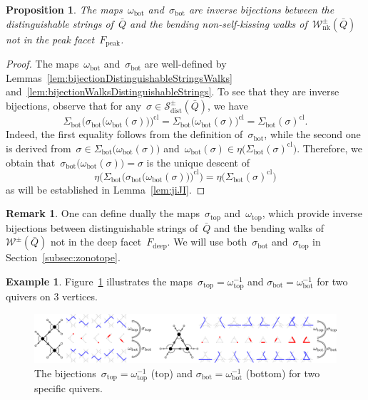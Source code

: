 \documentclass{amsart}
\newtheorem{proposition}[theorem]{Proposition}
\theoremstyle{definition}
\newtheorem{example}[theorem]{Example}
\newtheorem{remark}[theorem]{Remark}
\newcommand{\fref}[1]{Figure~\ref{#1}} %
\newcommand{\distinguishableStrings}{\mathcal{S}_\mathrm{dist}} %
\newcommand{\walks}{\mathcal{W}} %
\newcommand{\NKWalks}{\mathcal{W}_\mathrm{nk}} %
\newcommand{\peak}{\mathrm{peak}} %
\newcommand{\deep}{\mathrm{deep}} %
\renewcommand{\top}{\mathrm{top}} %
\newcommand{\bottom}{\mathrm{bot}} %
\newcommand{\closure}[1]{#1^{\mathrm{cl}}} %
\begin{document}
\begin{proposition}
\label{prop:bijectionDistinguishableStringsWalks}
The maps~$\omega_\bottom$ and~$\sigma_\bottom$ are inverse bijections between the distinguishable strings of~$\bar Q$ and the bending non-self-kissing walks of~$\NKWalks^\pm(\bar Q)$ not in the peak facet~$F_\peak$.
\end{proposition}

\begin{proof}
The maps~$\omega_\bottom$ and~$\sigma_\bottom$ are well-defined by Lemmas~\ref{lem:bijectionDistinguishableStringsWalks} and~\ref{lem:bijectionWalksDistinguishableStrings}.
To see that they are inverse bijections, observe that for any~$\sigma \in \distinguishableStrings^\pm(\bar Q)$, we have\[
\closure{ \Sigma_\bottom \big( \sigma_\bottom \big( \omega_\bottom(\sigma) \big) \big)}
= \closure{\Sigma_\bottom \big( \omega_\bottom(\sigma) \big)}
= \closure{\Sigma_\bottom(\sigma)}.
\]
Indeed, the first equality follows from the definition of~$\sigma_\bottom$, while the second one is derived from~$\sigma \in \Sigma_\bottom \big( \omega_\bottom(\sigma) \big)$ and~$\omega_\bottom(\sigma) \in \eta \big( \closure{\Sigma_\bottom(\sigma)} \big)$.
Therefore, we obtain that~$\sigma_\bottom \big( \omega_\bottom(\sigma) \big) = \sigma$ is the unique descent of
\[
\eta \big( \closure{ \Sigma_\bottom \big( \sigma_\bottom \big( \omega_\bottom(\sigma) \big) \big)} \big) = \eta \big( \closure{\Sigma_\bottom(\sigma)} \big)
\]
as will be established in Lemma~\ref{lem:jiJI}.
\end{proof}

\begin{remark}
\label{rem:bijectionDistinguishableStringsWalks}
One can define dually the maps~$\sigma_\top$ and~$\omega_\top$, which provide inverse bijections between distinguishable strings of~$\bar Q$ and the bending walks of~$\walks^\pm(\bar Q)$ not in the deep facet~$F_\deep$.
We will use both~$\sigma_\bottom$ and~$\sigma_\top$ in Section~\ref{subsec:zonotope}.
\end{remark}

\begin{example}
\fref{fig:exmBijectionStringsWalks2} illustrates the maps~$\sigma_\top = \omega_\top^{-1}$ and $\sigma_\bottom = \omega_\bottom^{-1}$ for two quivers on $3$ vertices.

\begin{figure}[t]
	\capstart
	\centerline{\includegraphics[scale=.4]{exmBijectionStringsWalks2}}
	\caption{The bijections~$\sigma_\top = \omega_\top^{-1}$ (top) and $\sigma_\bottom = \omega_\bottom^{-1}$ (bottom) for two specific quivers.}
	\label{fig:exmBijectionStringsWalks2}
\end{figure}
\end{example}
\end{document}
